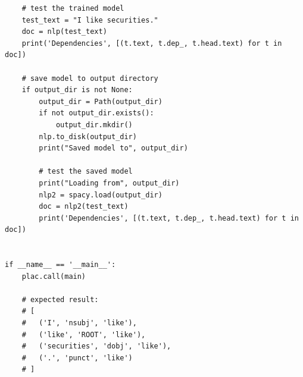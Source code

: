 \documentclass[12pt]{article}
\begin{document}
\begin{verbatim}
    # test the trained model
    test_text = "I like securities."
    doc = nlp(test_text)
    print('Dependencies', [(t.text, t.dep_, t.head.text) for t in doc])

    # save model to output directory
    if output_dir is not None:
        output_dir = Path(output_dir)
        if not output_dir.exists():
            output_dir.mkdir()
        nlp.to_disk(output_dir)
        print("Saved model to", output_dir)

        # test the saved model
        print("Loading from", output_dir)
        nlp2 = spacy.load(output_dir)
        doc = nlp2(test_text)
        print('Dependencies', [(t.text, t.dep_, t.head.text) for t in doc])


if __name__ == '__main__':
    plac.call(main)

    # expected result:
    # [
    #   ('I', 'nsubj', 'like'),
    #   ('like', 'ROOT', 'like'),
    #   ('securities', 'dobj', 'like'),
    #   ('.', 'punct', 'like')
    # ]
\end{verbatim}

\newpage
\end{document}
